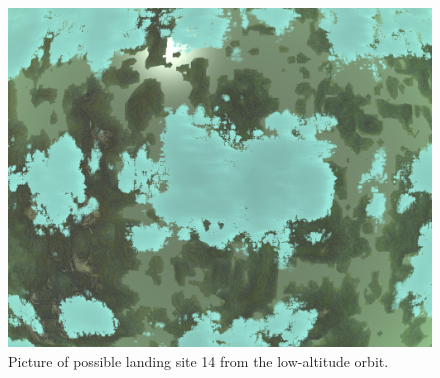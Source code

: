 \documentclass[reprint,english,notitlepage]{revtex4-2}
\begin{document}
    \begin{figure}[h]
        \centering
        \includegraphics[scale=0.14]{Figures/l_site14}
        \caption{Picture of possible landing site 14 from the low-altitude orbit.}\label{fig:l_site14}
    \end{figure}


\newpage
\end{document}
